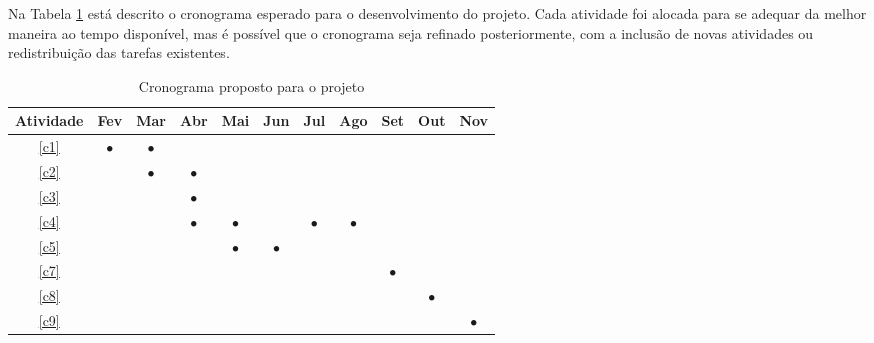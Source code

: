  
Na Tabela \ref{tab:cronograma} está descrito o cronograma esperado para o desenvolvimento do projeto. Cada atividade foi alocada para se adequar da melhor maneira ao tempo disponível, mas é possível que o cronograma seja refinado posteriormente, com a inclusão de novas atividades ou redistribuição das tarefas existentes. 

\begin{table}[h]

\renewcommand{\arraystretch}{1}
\setlength\tabcolsep{3pt}
\begin{center}
\begin{tabular}{| c | c | c | c | c | c | c | c | c | c | c |}
\hline

Atividade &Fev &Mar &Abr &Mai &Jun &Jul &Ago &Set &Out &Nov \\ \hline \hline
\ref{c1}   &$\bullet$ &$\bullet$ & & & & & & & & \\ \hline
\ref{c2}   & &$\bullet$ &$\bullet$ & & & & & & & \\ \hline
\ref{c3}   & & &$\bullet$ & & & & & & & \\ \hline
\ref{c4}   & & &$\bullet$ &$\bullet$ & &$\bullet$ &$\bullet$ & & & \\ \hline
\ref{c5}   & & & &$\bullet$ &$\bullet$ & & & & & \\ \hline
\ref{c7}   & & & & & & & &$\bullet$ & & \\ \hline
\ref{c8}   & & & & & & & & &$\bullet$ & \\ \hline
\ref{c9}   & & & & & & & & & &$\bullet$ \\ 
\hline
\end{tabular}
\end{center}
\caption{Cronograma proposto para o projeto}
\label{tab:cronograma}
\end{table}


 

